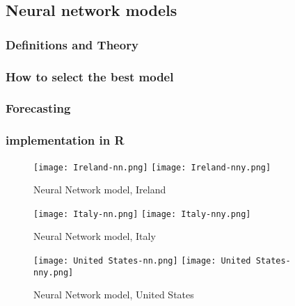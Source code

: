 \subsection{Neural network models}

\subsubsection{Definitions and Theory}

\subsubsection{How to select the best model}

\subsubsection{Forecasting}

\subsubsection{implementation in R}

\begin{figure}[H]
  \texttt{[image: Ireland-nn.png]} \label{fig:ireland-nn}
\endminipage\hfill
{}
  \texttt{[image: Ireland-nny.png]} \label{fig:ireland-nny}
\endminipage
\caption{Neural Network model, Ireland}
\end{figure}

\begin{figure}[H]
  \texttt{[image: Italy-nn.png]} \label{fig:italy-nn}
\endminipage\hfill
{}
  \texttt{[image: Italy-nny.png]} \label{fig:italy-nny}
\endminipage
\caption{Neural Network model, Italy}
\end{figure}

\begin{figure}[H]
  \texttt{[image: United States-nn.png]} \label{fig:usa-nn}
\endminipage\hfill
{}
  \texttt{[image: United States-nny.png]} \label{fig:usa-nny}
\endminipage
\caption{Neural Network model, United States}
\end{figure}
